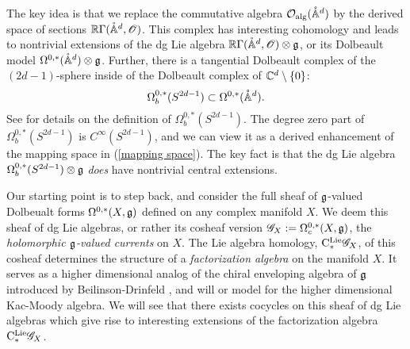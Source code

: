 The key idea is that we replace the commutative algebra $\mathcal O_{\rm alg}(\mathring{\mathbb A}^{d})$ by the derived space of sections $\mathbb R \Gamma(\mathring{\mathbb A}^{d}, \mathscr O)$. 
This complex has interesting cohomology and leads to nontrivial extensions of the dg Lie algebra $\mathbb R \Gamma(\mathring{\mathbb A}^{d}, \mathscr O) \otimes \mathfrak g$, or its Dolbeault model $\Omega^{0,*}(\mathring{\mathbb A}^d) \otimes \mathfrak g$.
Further, there is a tangential Dolbeault complex of the $(2d-1)$-sphere inside of the Dolbeault complex of $\mathbb C^d \setminus \{0\}$:
\[
\Omega_b^{0,*}(S^{2d-1}) \subset \Omega^{0,*}(\mathring{\mathbb A}^d) .
\]
See \cite{DragomirTomassini} for details on the definition of $\Omega_b^{0,*}(S^{2d-1})$. 
The degree zero part of $\Omega_b^{0,*}(S^{2d-1})$ is $C^\infty(S^{2d-1})$, and we can view it as a derived enhancement of the mapping space in (\ref{mapping space}). 
The key fact is that the dg Lie algebra $\Omega^{0,*}_b(S^{2d-1}) \otimes \mathfrak g$ {\em does} have nontrivial central extensions. 

Our starting point is to step back, and consider the full sheaf of $\mathfrak g$-valued Dolbeualt forms $\Omega^{0,*}(X, \mathfrak g)$ defined on any complex manifold $X$. 
We deem this sheaf of dg Lie algebras, or rather its cosheaf version $\mathscr G_X := \Omega^{0,*}_c(X, \mathfrak g)$, the {\em holomorphic $\mathfrak g$-valued currents} on $X$. 
The Lie algebra homology, ${\rm C}^{\rm Lie}_*\mathscr G_X$, of this cosheaf determines the structure of a {\em factorization algebra} on the manifold $X$.
It serves as a higher dimensional analog of the chiral enveloping algebra of $\mathfrak g$ introduced by Beilinson-Drinfeld \cite{BD}, and will or model for the higher dimensional Kac-Moody algebra. 
We will see that there exists cocycles on this sheaf of dg Lie algebras which give rise to interesting extensions of the factorization algebra ${\rm C}^{\rm Lie}_*\mathscr G_X$.\\




